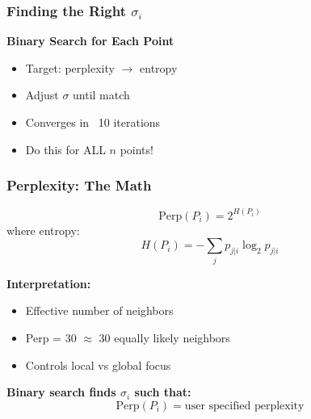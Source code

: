 \documentclass[aspectratio=169]{beamer}
\begin{document}
\begin{frame}
\frametitle{Finding the Right $\sigma_i$}

\begin{center}
\textbf{Binary Search for Each Point}\\[0.5cm]

\end{center}

\begin{itemize}
\item Target: perplexity $\rightarrow$ entropy
\item Adjust $\sigma$ until match
\item Converges in ~10 iterations
\item Do this for ALL $n$ points!
\end{itemize}

\end{frame}

\begin{frame}
\frametitle{Perplexity: The Math}

\begin{definition}[Perplexity]
$$\text{Perp}(P_i) = 2^{H(P_i)}$$
where entropy:
$$H(P_i) = -\sum_j p_{j|i} \log_2 p_{j|i}$$
\end{definition}

\textbf{Interpretation:}
\begin{itemize}
\item Effective number of neighbors
\item Perp = 30 $\approx$ 30 equally likely neighbors
\item Controls local vs global focus
\end{itemize}

\textbf{Binary search finds $\sigma_i$ such that:}
$$\text{Perp}(P_i) = \text{user specified perplexity}$$

\end{frame}
\end{document}
